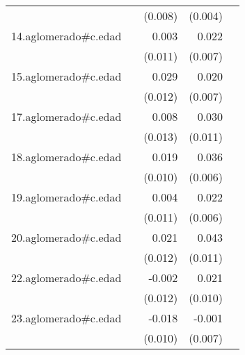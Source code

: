 {\begin{longtable}{l*{4}{D{.}{.}{-1}}}
            &                     &     (0.008)         &     (0.004)         &                     \\
\addlinespace
14.aglomerado#c.edad&                     &       0.003         &       0.022\sym{**} &                     \\
            &                     &     (0.011)         &     (0.007)         &                     \\
\addlinespace
15.aglomerado#c.edad&                     &       0.029\sym{*}  &       0.020\sym{**} &                     \\
            &                     &     (0.012)         &     (0.007)         &                     \\
\addlinespace
17.aglomerado#c.edad&                     &       0.008         &       0.030\sym{**} &                     \\
            &                     &     (0.013)         &     (0.011)         &                     \\
\addlinespace
18.aglomerado#c.edad&                     &       0.019         &       0.036\sym{***}&                     \\
            &                     &     (0.010)         &     (0.006)         &                     \\
\addlinespace
19.aglomerado#c.edad&                     &       0.004         &       0.022\sym{***}&                     \\
            &                     &     (0.011)         &     (0.006)         &                     \\
\addlinespace
20.aglomerado#c.edad&                     &       0.021         &       0.043\sym{***}&                     \\
            &                     &     (0.012)         &     (0.011)         &                     \\
\addlinespace
22.aglomerado#c.edad&                     &      -0.002         &       0.021\sym{*}  &                     \\
            &                     &     (0.012)         &     (0.010)         &                     \\
\addlinespace
23.aglomerado#c.edad&                     &      -0.018         &      -0.001         &                     \\
            &                     &     (0.010)         &     (0.007)         &                     \\

\end{longtable}}
